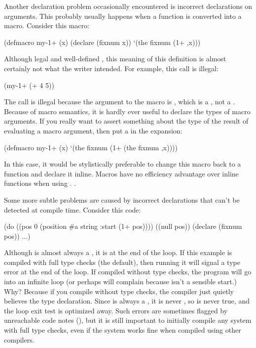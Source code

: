 {Another declaration problem occasionally encountered is incorrect declarations
on  arguments.  This probably usually happens when a function is
converted into a macro.   Consider this macro:
\begin{lisp}
(defmacro my-1+ (x)
  (declare (fixnum x))
  `(the fixnum (1+ ,x)))
\end{lisp}
Although legal and well-defined \clisp, this meaning of this definition is
almost certainly not what the writer intended.  For example, this call is
illegal:
\begin{lisp}
(my-1+ (+ 4 5))
\end{lisp}
The call is illegal because the argument to the macro is , which
is a , not a .  Because of macro semantics, it is hardly ever
useful to declare the types of macro arguments.  If you really want to assert
something about the type of the result of evaluating a macro argument, then put
a  in the expansion:
\begin{lisp}
(defmacro my-1+ (x)
  `(the fixnum (1+ (the fixnum ,x))))
\end{lisp}
In this case, it would be stylistically preferable to change this macro back to
a function and declare it inline.  Macros have no efficiency advantage over
inline functions when using \Python.  .


Some more subtle problems are caused by incorrect declarations that can't be
detected at compile time.  Consider this code:
\begin{example}
(do ((pos 0 (position #\back a string :start (1+ pos))))
    ((null pos))
  (declare (fixnum pos))
  ...)
\end{example}
Although  is almost always a , it is \false{} at the end of the
loop.  If this example is compiled with full type checks (the default), then
running it will signal a type error at the end of the loop.  If compiled
without type checks, the program will go into an infinite loop (or perhaps
 will complain because  isn't a sensible start.)
Why?  Because if you compile without type checks, the compiler just quietly
believes the type declaration.  Since  is always a , it is
never \nil, so  is never true, and the loop exit test is
optimized away.  Such errors are sometimes flagged by unreachable code notes
(), but it is still important to initially compile
any system with full type checks, even if the system works fine when compiled
using other compilers.

}

